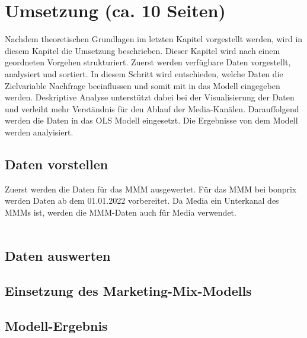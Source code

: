 \newpage
\section{Umsetzung (ca. 10 Seiten)}
Nachdem theoretischen Grundlagen im letzten Kapitel vorgestellt werden, wird in diesem Kapitel die Umsetzung beschrieben. Dieser Kapitel wird nach einem geordneten Vorgehen strukturiert. Zuerst werden verfügbare Daten vorgestellt, analysiert und sortiert. In diesem Schritt wird entschieden, welche Daten die Zielvariable Nachfrage beeinflussen und somit mit in das Modell eingegeben werden. Deskriptive Analyse unterstützt dabei bei der Visualisierung der Daten und verleiht mehr Verständnis für den Ablauf der Media-Kanälen. Darauffolgend werden die Daten in das OLS Modell eingesetzt. Die Ergebnisse von dem Modell werden analyisiert.
\subsection{Daten vorstellen}
Zuerst werden die Daten für das \ac{MMM} ausgewertet. Für das \ac{MMM} bei bonprix werden Daten ab dem 01.01.2022 vorbereitet. Da Media ein Unterkanal des \ac{MMM}s ist, werden die \ac{MMM}-Daten auch für Media verwendet. \\\\

\subsection{Daten auswerten}
\subsection{Einsetzung des Marketing-Mix-Modells}
\subsection{Modell-Ergebnis}
